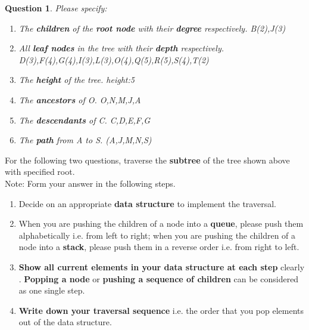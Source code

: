 \documentclass{article}
\newtheorem{Q}{Question}
\begin{document}
\begin{Q} Please specify:
	\begin{enumerate}[1.]
		\item The \textbf{children} of the \textbf{root node} with their \textbf{degree} respectively.	B(2),J(3)
		\item All \textbf{leaf nodes} in the tree with their \textbf{depth} respectively.	D(3),F(4),G(4),I(3),L(3),O(4),Q(5),R(5),S(4),T(2)
		\item The \textbf{height} of the tree.	height:5
		\item The \textbf{ancestors} of O.	O,N,M,J,A
		\item The \textbf{descendants} of C.	C,D,E,F,G
		\item The \textbf{path} from A to S.	(A,J,M,N,S)
	\end{enumerate}
\end{Q}

For the following two questions, traverse the \textbf{subtree} of the tree shown above with specified root.\\

Note: Form your answer in the following steps.
\begin{enumerate}[1.]
	\item Decide on an appropriate \textbf{data structure} to implement the traversal.
	\item When you are pushing the children of a node into a \textbf{queue}, please push them alphabetically i.e. from left to right; when you are pushing the children of a node into a \textbf{stack}, please push them in a reverse order i.e. from right to left.
	\item \textbf{Show all current elements in your data structure at each step} clearly  . \textbf{Popping a node} or \textbf{pushing a sequence of children} can be considered as one single step.
	\item \textbf{Write down your traversal sequence} i.e. the order that you pop elements out of the data structure.
\end{enumerate}
\end{document}
